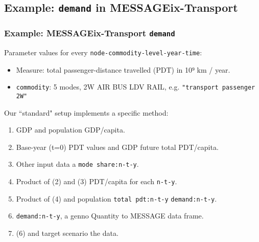 \documentclass[12pt,aspectratio=169]{beamer}
\newcommand{\py}[1]{\texttt{#1}}
\begin{document}
\subsection{Example: \texttt{demand} in MESSAGEix-Transport}

\begin{frame}
\frametitle{Example: MESSAGEix-Transport \texttt{demand}}

Parameter values for every \texttt{node-commodity-level-year-time}:
\begin{itemize}
  \item Measure: total passenger-distance travelled (PDT) in 10⁹ km / year.
  \item \texttt{commodity}: 5 modes, 2W AIR BUS LDV RAIL, e.g. \py{"transport passenger 2W"}
\end{itemize}

\medskip\pause
Our “standard" setup implements a specific method:
\begin{enumerate}
  \item GDP and population  GDP/capita.
  \item Base-year (t=0) PDT values and GDP  future total PDT/capita.
  \item Other input data  a \texttt{mode share:n-t-y}.

  \pause
  \item Product of (2) and (3)  PDT/capita for each \texttt{n-t-y}.
  \item Product of (4) and population
     \texttt{total pdt:n-t-y}
     \texttt{demand:n-t-y}.
  \item \texttt{demand:n-t-y}, a genno Quantity  to MESSAGE data frame.
  \item (6) and target scenario  the data.
\end{enumerate}
\end{frame}
\end{document}
